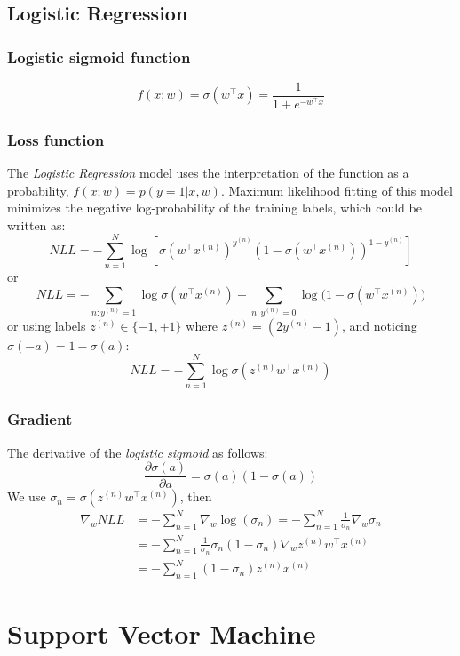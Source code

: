 \documentclass[a4paper, 12pt]{book} %
\begin{document}
\section{Logistic Regression}
\subsection{Logistic sigmoid function}
$$f(x;w)=\sigma{(w^\top x)}=\frac{1}{1+e^{-w^\top x}}$$ 
\subsection{Loss function}
The \emph{Logistic Regression} model uses the interpretation of the function as a probability, $f(x;w)=p{(y=1|x,w)}$. Maximum likelihood fitting of this model minimizes the negative log-probability of the training labels, which could be written as:
$$NLL=-\sum_{n=1}^N{\log[\sigma{(w^\top x^{(n)})^{y^{(n)}}}(1-\sigma{(w^\top x^{(n)})})^{1-y^{(n)}}]}$$
or 
$$NLL=-\sum_{n:y^{(n)}=1}{\log{\sigma{(w^\top x^{(n)})}}}-\sum_{n:y^{(n)}=0}{\log{(1-\sigma{(w^\top x^{(n)})}})}$$ 
or using labels $z^{(n)} \in \{-1, +1\}$ where $z^{(n)}=(2y^{(n)}-1)$, and noticing $\sigma{(-a)}=1-\sigma{(a)}$:
$$NLL=-\sum_{n=1}^{N}{\log{\sigma{(z^{(n)}w^\top x^{(n)})}}}$$

\subsection{Gradient}
The derivative of the \emph{logistic sigmoid} as follows:
$$\frac{\partial{\sigma{(a)}}}{\partial{a}}=\sigma{(a)}(1-\sigma{(a)})$$
We use $\sigma_{n}=\sigma{(z^{(n)}w^\top x^{(n)})}$, then
\begin{equation}
\begin{split}\nabla_w{NLL} & =-\sum_{n=1}^{N}{\nabla_w{\log{(\sigma_{n})}}}=-\sum_{n=1}^{N}{\frac{1}{\sigma_{n}}\nabla_w{\sigma_{n}}}\\
&=-\sum_{n=1}^{N}{\frac{1}{\sigma_{n}}\sigma_{n}(1-\sigma_{n})\nabla_w{z^{(n)}w^{\top}x^{(n)}}}\\
&=-\sum_{n=1}^{N}{(1-\sigma_n)z^{(n)}x^{(n)}}\end{split}
\end{equation} 



\chapter{Support Vector Machine}
\end{document}

